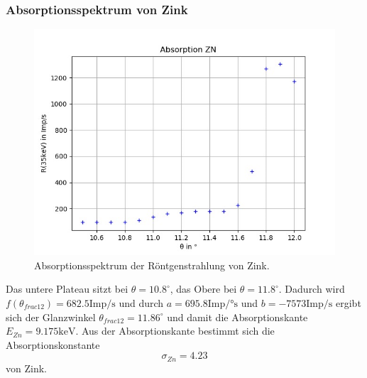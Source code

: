 \subsubsection*{Absorptionsspektrum von Zink}
\begin{figure}[H]
  \centering
  \includegraphics{content/Zn.png}
  \caption{Absorptionsspektrum der Röntgenstrahlung von Zink.}
  \label{fig:zn}
\end{figure}
Das untere Plateau sitzt bei $\theta=10.8^\circ$, das Obere bei $\theta=11.8^\circ$. Dadurch wird $f(\theta_{frac{1}{2}})=682.5 \textrm{Imp/s}$ und durch $a=695.8 \textrm{Imp/°s}$ und $b=-7573 \textrm{Imp/s}$ ergibt sich der Glanzwinkel $\theta_{frac{1}{2}}=11.86^\circ$ und damit die Absorptionskante $E_{Zn}=9.175 \textrm{keV}$. Aus der Absorptionskante bestimmt sich die Absorptionskonstante
\begin{equation*}
  \sigma_{Zn}=4.23
\end{equation*}
von Zink.

